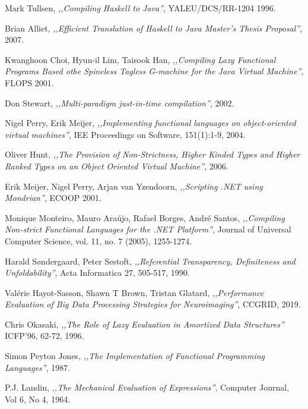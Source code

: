 \documentclass[en]{pracamgr}
\begin{document}
\begin{thebibliography}{99}

 Mark Tullsen, \textit{,,Compiling Haskell to Java''}, YALEU/DCS/RR-1204
1996.

 Brian Alliet, \textit{,,Efficient Translation of Haskell to Java
Master’s Thesis Proposal''}, 2007.

 Kwanghoon Choi, Hyun-il Lim, Taisook Han, \textit{,,Compiling Lazy Functional Programs Based othe Spineless Tagless G-machine for the Java Virtual Machine''}, FLOPS 2001.

 Don Stewart, \textit{,,Multi-paradigm just-in-time compilation''}, 2002.

 Nigel Perry, Erik Meijer, \textit{,,Implementing functional languages on object-oriented virtual machines''}, IEE Proceedings on Software, 151(1):1-9, 2004.

 Oliver Hunt, \textit{,,The Provision of Non-Strictness, Higher Kinded Types
and Higher Ranked Types on an Object Oriented Virtual Machine''}, 2006.

 Erik Meijer, Nigel Perry, Arjan van Yzendoorn, \textit{,,Scripting .NET using Mondrian''}, ECOOP 2001.

 Monique Monteiro, Mauro Ara\'ujo, Rafael Borges, Andr\'e Santos,  \textit{,,Compiling Non-strict Functional Languages for the .NET Platform''}, Journal of Universal Computer Science, vol. 11, no. 7 (2005), 1255-1274.

 Harald Søndergaard, Peter Sestoft, \textit{,,Referential Transparency, Definiteness and Unfoldability''}, Acta Informatica 27, 505-517, 1990.

 Val\'erie Hayot-Sasson, Shawn T Brown, Tristan Glatard, \textit{,,Performance Evaluation of Big Data Processing Strategies for Neuroimaging''}, CCGRID, 2019.

 Chris Okasaki, \textit{,,The Role of Lazy Evaluation in Amortized Data Structures''} ICFP'96, 62-72, 1996.

 Simon Peyton Jones, \textit{,,The Implementation of Functional Programming Languages''}, 1987.

 P.J. Landin, \textit{,,The Mechanical Evaluation of Expressions''}, Computer Journal, Vol 6, No 4, 1964.


\end{thebibliography}
\end{document}
